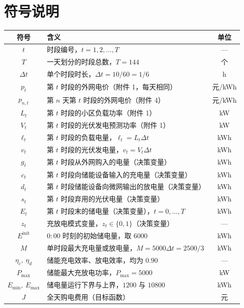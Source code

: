\documentclass[withoutpreface,bwprint]{cumcmthesis}
\begin{document}
\section{符号说明}

\begin{center}
\begin{tabular}{clc}
  \toprule
  符号 & 含义 & 单位 \\
  \midrule
  $t$ & 时段编号，$t = 1, 2, \dots, T$ & --- \\
  $T$ & 一天划分的时段总数，$T = 144$ & 个 \\
  $\Delta t$ & 单个时段时长，$\Delta t = 10/60 = 1/6$ & h \\
  $p_t$ & 第 $t$ 时段的外网电价（附件 1，每天相同） & 元/kWh \\
  $p_{n,t}$ & 第 $n$ 天第 $t$ 时段的外网电价（附件 4） & 元/kWh \\
  $L_t$ & 第 $t$ 时段的小区负载功率（附件 1） & kW \\
  $V_t$ & 第 $t$ 时段的光伏发电预测功率（附件 1） & kW \\
  $\ell_t$ & 第 $t$ 时段的负载电量，$\ell_t = L_t \Delta t$ & kWh \\
  $v_t$ & 第 $t$ 时段的光伏发电量，$v_t = V_t \Delta t$ & kWh \\
  $g_t$ & 第 $t$ 时段从外网购入的电量（决策变量） & kWh \\
  $c_t$ & 第 $t$ 时段向储能设备输入的充电量（决策变量） & kWh \\
  $d_t$ & 第 $t$ 时段储能设备向微网输出的放电量（决策变量） & kWh \\
  $s_t$ & 第 $t$ 时段弃用的光伏电量（决策变量） & kWh \\
  $E_t$ & 第 $t$ 时段末的储电量（决策变量），$t = 0,\dots,T$ & kWh \\
  $z_t$ & 充放电模式变量，$z_t \in \{0,1\}$（决策变量） & --- \\
  $E^{\mathrm{init}}$ & $0{:}00$ 时刻的初始储电量，取 $6000$ & kWh \\
  $M$ & 单时段最大充电量或放电量，$M = 5000 \Delta t = 2500/3$ & kWh \\
  $\eta_c,\ \eta_d$ & 储能充电效率、放电效率，均为 $0.90$ & --- \\
  $P_{\max}$ & 储能最大充放电功率，$P_{\max} = 5000$ & kW \\
  $E_{\min},\ E_{\max}$ & 储电量运行下界与上界，$1200$ 与 $10800$ & kWh \\
  $J$ & 全天购电费用（目标函数） & 元 \\
  \bottomrule
\end{tabular}
\end{center}
\end{document}

